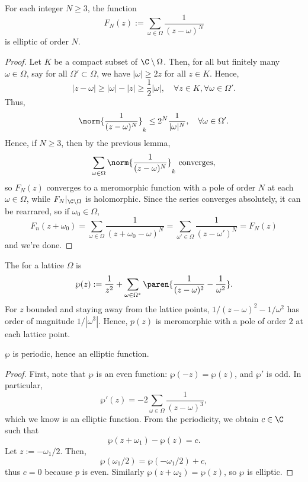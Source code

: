 \documentclass[11pt]{report}
\begin{document}
\begin{cor}
    For each integer $N \geq 3$, the function 
    $$F_N(z):= \sum_{\omega \in \Omega}\frac{1}{(z-\omega)^N}$$
    is elliptic of order $N$.
\end{cor}

\begin{proof}
    Let $K$ be a compact subset of $\C \setminus \Omega$. Then, for all but finitely many $\omega \in \Omega$, say for all $\Omega'\subset \Omega$, we have $|\omega| \geq 2z$ for all $z \in K$. Hence,
    $$|z-\omega| \geq |\omega| - |z| \geq \frac{1}{2}|\omega|, \quad \forall z \in K,\forall \omega \in \Omega'.$$
    Thus,
    $$\norm{\frac{1}{(z-\omega)^N}}_k \leq 2^N \frac{1}{|\omega|^N}, \quad \forall \omega \in \Omega'.$$
    Hence, if $N \geq 3$, then by the previous lemma,
    $$\sum_{\omega \in \Omega}\norm{\frac{1}{(z-\omega)^N}}_k \text{ converges,}$$
    so $F_N(z)$ converges to a meromorphic function with a pole of order $N$ at each $\omega \in \Omega$, while $F_N|_{\C\setminus \Omega}$ is holomorphic. Since the series converges absolutely, it can be rearrared, so if $\omega_0 \in \Omega$,
    $$F_n(z+\omega_0) = \sum_{\omega \in \Omega}\frac{1}{(z+\omega_0-\omega)^N}=\sum_{\omega' \in \Omega}\frac{1}{(z-\omega')^N}=F_N(z)$$
    and we're done.
\end{proof}

\begin{defn}
    The  for a lattice 
    $\Omega$ is
    $$\wp(z) := \frac{1}{z^2} + \sum_{\omega \in \Omega^*}\paren{\frac{1}{(z-\omega)^2}-\frac{1}{\omega^2}}.$$
    For $z$ bounded and staying away from the lattice points, $1/(z-\omega)^2 - 1/\omega^2$ has order of magnitude $1/|\omega^3|$. Hence, $p(z)$ is meromorphic with a pole of order $2$ at each lattice point.
\end{defn}

\begin{thm}
    $\wp$ is periodic, hence an elliptic function.
\end{thm}

\begin{proof}
    First, note that $\wp$ is an even function: $\wp(-z)=\wp(z)$, and $\wp'$ is odd. In particular,
    $$\wp'(z) = -2\sum_{\omega \in \Omega}\frac{1}{(z-\omega)^3},$$
    which we know is an elliptic function. From the periodicity, we obtain $c \in \C$ such that
    $$\wp(z+\omega_1) - \wp(z) =c.$$
    Let $z:=-\omega_1/2$. Then,
    $$\wp(\omega_1/2) = \wp(-\omega_1/2) + c,$$
    thus $c=0$ because $p$ is even. Similarly $\wp(z+\omega_2)=\wp(z)$, so $\wp$ is elliptic.
\end{proof}
\end{document}
